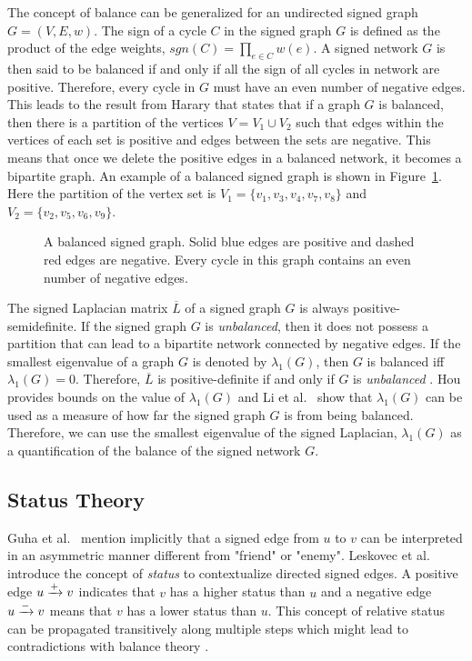 The concept of balance can be generalized for an undirected signed graph $G=(V,E,w)$.
The sign of a cycle $C$ in the signed graph $G$ is defined as the product of the edge weights, $sgn(C)=\prod_{e\in C}w(e)$.
A signed network $G$ is then said to be balanced if and only if all the sign of all cycles in network are positive.
Therefore, every cycle in $G$ must have an even number of negative edges.
This leads to the result from Harary \cite{harary1953on} that states that if a graph $G$ is balanced, then there is a partition of the vertices $V = V_1 \cup V_2$ such that edges within the vertices of each set is positive and edges between the sets are negative.
This means that once we delete the positive edges in a balanced network, it becomes a bipartite graph.
An example of a balanced signed graph is shown in Figure~\ref{fig:balanced-graph}.
Here the partition of the vertex set is $V_1 = \{v_1,v_3,v_4,v_7,v_8\}$ and $V_2 = \{v_2,v_5,v_6,v_9\}$.

\begin{figure}[!ht]
    \centering
    
    \caption{ A balanced signed graph. Solid blue edges are positive and dashed red edges are negative. Every cycle in this graph contains an even number of negative edges.}
    \label{fig:balanced-graph}
\end{figure}

The signed Laplacian matrix $\overline{L}$ of a signed graph $G$ is always positive-semidefinite.
If the signed graph $G$ is \textit{unbalanced}, then it does not possess a partition that can lead to a bipartite network connected by negative edges.
If the smallest eigenvalue of a graph $G$ is denoted by $\lambda_{1}(G)$, then $G$ is balanced iff $\lambda_{1}(G)=0$.
Therefore, $\overline{L}$ is positive-definite if and only if $G$ is \textit{unbalanced} \cite{kunegis2010spectral,hou2005bounds,zaslavsky1982signed}.
Hou \cite{hou2005bounds} provides bounds on the value of $\lambda_{1}(G)$ and Li et al.\ \cite{li2016note} show that $\lambda_{1}(G)$ can be used as a measure of how far the signed graph $G$ is from being balanced. 
Therefore, we can use the smallest eigenvalue of the signed Laplacian, $\lambda_{1}(G)$ as a quantification of the balance of the signed network $G$.

\subsection{Status Theory}
\label{sec:status-theory}
Guha et al.\ \cite{guha2004propagation} mention implicitly that a signed edge from $u$ to $v$ can be interpreted in an asymmetric manner different from "friend" or "enemy".
Leskovec et al.\ \cite{leskovec2010signed,leskovec2010predicting} introduce the concept of \textit{status} to contextualize directed signed edges.
A positive edge $u \xrightarrow{+} v$ indicates that $v$ has a higher status than $u$ and a negative edge $u \xrightarrow{-} v$ means that $v$ has a lower status than $u$.
This concept of relative status can be propagated transitively along multiple steps which might lead to contradictions with balance theory \cite{leskovec2010signed}.

